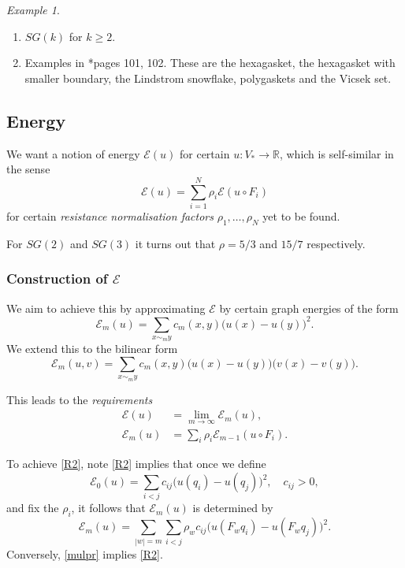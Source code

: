 \documentclass[a4paper]{amsart}
\theoremstyle{plain}
\theoremstyle{definition}
\theoremstyle{remark}
\newtheorem{example}[theorem]{Example}
\begin{document}
\begin{example}
\mbox{}
\begin{enumerate}
\item $ SG(k) $ for $ k \geq 2 $.
\item  Examples in \cite{Str}*{pages 101, 102}.  These are the hexagasket, the hexagasket with smaller boundary, the Lindstrom snowflake,  polygaskets and the Vicsek set.
\end{enumerate} 
\end{example} 

\subsection{Energy}

We want a notion of energy $ \mathcal{E} (u) $ for certain $ u:V_* \to \mathbb{R} $, which is self-similar in the sense
\begin{equation} \label{sce} 
\mathcal{E} (u) = \sum_{i=1}^N \rho_i \mathcal{E} (u \circ F_i ) 
\end{equation} 
for certain \emph{resistance normalisation factors} $ \rho_1,\dots,\rho_N $ yet to be found.

For $ SG(2) $ and $ SG(3) $ it turns out that $ \rho = 5/3 $ and $ 15/7 $ respectively.

\subsubsection{Construction of $ \mathcal{E} $}
  We aim to achieve this by approximating $ \mathcal{E} $ by certain graph energies of the form 
\begin{equation} \label{ena} 
\mathcal{E} _m (u) = \sum_{x\sim_m y } c_m(x,y) \big( u(x) - u(y) \big)^2.
\end{equation} 
We extend this to the bilinear form 
\begin{equation} \label{} 
\mathcal{E} _m (u,v) = \sum_{x\sim_m y } c_m(x,y) \big( u(x) - u(y) \big) \big( v(x) - v(y) \big) .
\end{equation} 

\bigskip
This leads to the \emph{requirements}
\begin{align}
\mathcal{E} (u) &= \lim_{m\to \infty} \mathcal{E} _m (u) \tag{R1}\label{R1}, \\
\mathcal{E}_m(u) &= \sum_i \rho_i \mathcal{E}_{m-1} (u \circ F_i).   \tag{R2} \label{R2}
\end{align} 

 \bigskip To achieve \eqref{R2}, note \eqref{R2} implies that once we define 
\begin{equation} \label{1case} 
\mathcal{E} _0 (u) = \sum_{i< j} c_{ij} \big( u(q_i) - u(q_j) \big) ^2 ,\quad c_{ij}>0, 
\end{equation} 
and fix the $ \rho_i $, it follows that $ \mathcal{E} _m (u) $ is determined by
\begin{equation} \label{mulpr} 
\mathcal{E} _m (u) = \sum_{ |w| = m }  \sum_{i< j}  \rho_w c_{ij}  \big( u(F_w q_i) - u(F_w q_j) \big) ^2 .
\end{equation} 
Conversely, \eqref{mulpr} implies \eqref{R2}.
\end{document}
